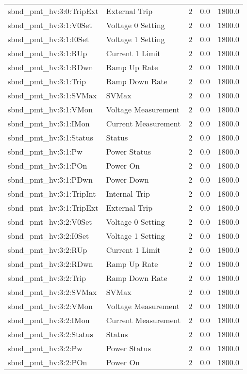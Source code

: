 \begin{center}
\begin{longtable}{l | l l l l }
sbnd\_pmt\_hv:3:0:TripExt & External Trip & 2 & 0.0 & 1800.0\\ 
sbnd\_pmt\_hv:3:1:V0Set & Voltage 0 Setting & 2 & 0.0 & 1800.0\\ 
sbnd\_pmt\_hv:3:1:I0Set & Voltage 1 Setting & 2 & 0.0 & 1800.0\\ 
sbnd\_pmt\_hv:3:1:RUp & Current 1 Limit & 2 & 0.0 & 1800.0\\ 
sbnd\_pmt\_hv:3:1:RDwn & Ramp Up Rate & 2 & 0.0 & 1800.0\\ 
sbnd\_pmt\_hv:3:1:Trip & Ramp Down Rate & 2 & 0.0 & 1800.0\\ 
sbnd\_pmt\_hv:3:1:SVMax & SVMax & 2 & 0.0 & 1800.0\\ 
sbnd\_pmt\_hv:3:1:VMon & Voltage Measurement & 2 & 0.0 & 1800.0\\ 
sbnd\_pmt\_hv:3:1:IMon & Current Measurement & 2 & 0.0 & 1800.0\\ 
sbnd\_pmt\_hv:3:1:Status & Status & 2 & 0.0 & 1800.0\\ 
sbnd\_pmt\_hv:3:1:Pw & Power Status & 2 & 0.0 & 1800.0\\ 
sbnd\_pmt\_hv:3:1:POn & Power On & 2 & 0.0 & 1800.0\\ 
sbnd\_pmt\_hv:3:1:PDwn & Power Down & 2 & 0.0 & 1800.0\\ 
sbnd\_pmt\_hv:3:1:TripInt & Internal Trip & 2 & 0.0 & 1800.0\\ 
sbnd\_pmt\_hv:3:1:TripExt & External Trip & 2 & 0.0 & 1800.0\\ 
sbnd\_pmt\_hv:3:2:V0Set & Voltage 0 Setting & 2 & 0.0 & 1800.0\\ 
sbnd\_pmt\_hv:3:2:I0Set & Voltage 1 Setting & 2 & 0.0 & 1800.0\\ 
sbnd\_pmt\_hv:3:2:RUp & Current 1 Limit & 2 & 0.0 & 1800.0\\ 
sbnd\_pmt\_hv:3:2:RDwn & Ramp Up Rate & 2 & 0.0 & 1800.0\\ 
sbnd\_pmt\_hv:3:2:Trip & Ramp Down Rate & 2 & 0.0 & 1800.0\\ 
sbnd\_pmt\_hv:3:2:SVMax & SVMax & 2 & 0.0 & 1800.0\\ 
sbnd\_pmt\_hv:3:2:VMon & Voltage Measurement & 2 & 0.0 & 1800.0\\ 
sbnd\_pmt\_hv:3:2:IMon & Current Measurement & 2 & 0.0 & 1800.0\\ 
sbnd\_pmt\_hv:3:2:Status & Status & 2 & 0.0 & 1800.0\\ 
sbnd\_pmt\_hv:3:2:Pw & Power Status & 2 & 0.0 & 1800.0\\ 
sbnd\_pmt\_hv:3:2:POn & Power On & 2 & 0.0 & 1800.0\\ 

\end{longtable}
\end{center}
